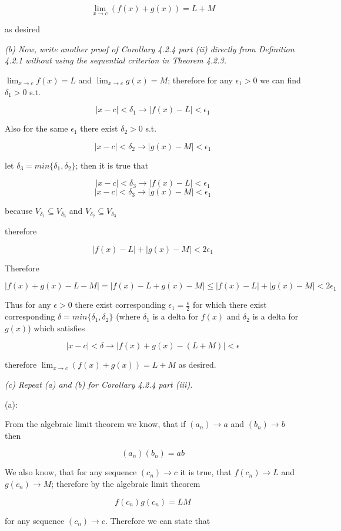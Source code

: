 \documentclass[11pt,oneside,titlepage]{book}
\begin{document}
$$\lim_{x \to c}(f(x) + g(x)) = L + M $$

as desired

\textit{(b) Now, write another proof of Corollary 4.2.4 part (ii) directly from Definition 4.2.1 without using the sequential criterion in Theorem 4.2.3.}

$\lim_{x \to c} f(x) = L$ and $\lim_{x \to c} g(x) = M$; therefore for any $\epsilon_1 > 0$ we can find $\delta_1 > 0$ s.t.

$$ |x - c| < \delta_1 \to |f(x) - L| < \epsilon_1 $$

Also for the same $\epsilon_1$ there exist $\delta_2 > 0$ s.t.

$$ |x - c| < \delta_2 \to |g(x) - M| < \epsilon_1 $$

let $\delta_3 = min\{\delta_1, \delta_2\}$; then it is true that 

$$ |x - c| < \delta_3 \to |f(x) - L| < \epsilon_1 $$
$$ |x - c| < \delta_3 \to |g(x) - M| < \epsilon_1 $$

because $V_{\delta_1} \subseteq V_{\delta_3} $ and $V_{\delta_2} \subseteq V_{\delta_3} $

therefore

$$|f(x) - L| + |g(x) - M| < 2 \epsilon_1$$

Therefore 

$$ |f(x) + g(x) - L -  M| = |f(x) - L + g(x) - M| \leq |f(x) - L| + |g(x) - M| < 2 \epsilon_1 $$

Thus for any $\epsilon > 0$ there exist corresponding $\epsilon_1 = \frac{\epsilon}{2}$ for which there
exist corresponding $\delta = min\{\delta_1, \delta_2\}$ (where $\delta_1$ is a delta for $f(x)$ and
$\delta_2$ is a delta for $g(x)$) which satisfies

$$|x - c| < \delta \to |f(x) + g(x) - (L + M)| < \epsilon$$

therefore $\lim_{x \to c}(f(x) + g(x)) = L + M$ as desired.

\textit{(c) Repeat (a) and (b) for Corollary 4.2.4 part (iii).}

(a):

From the algebraic limit theorem we know, that if $(a_n) \to a$ and $(b_n) \to b$ then

$$(a_n) (b_n) = a  b$$

We also know, that for any sequence $(c_n) \to c$ it is true, that $f(c_n) \to L$ and $g(c_n) \to M$;
therefore by the algebraic limit theorem

$$f(c_n)  g(c_n) = L M$$

for any sequence $(c_n) \to c$. Therefore we can state that
\end{document}
